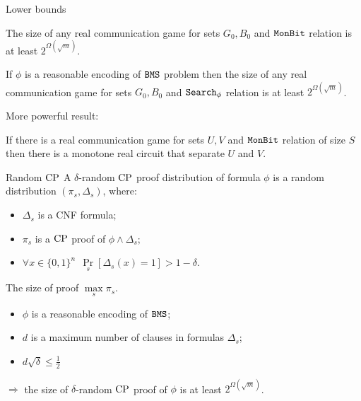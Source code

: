 \begin{frame}{Lower bounds}


    \begin{theorem}[S 2016, unp.]
        The size of any real communication game for sets $G_0, B_0$ and $\mathtt{MonBit}$ relation is at least $2^{\Omega(\sqrt{m})}$.

        If $\phi$ is a reasonable encoding of $\mathtt{BMS}$ problem then the size of any real communication game for sets $G_0, B_0$
        and $\mathtt{Search}_{\phi}$ relation is at least $2^{\Omega(\sqrt{m})}$.
    \end{theorem}

    More powerful result:
    \begin{theorem}
        If there is a real communication game for sets $U, V$ and $\mathtt{MonBit}$ relation of size $S$ then there is a monotone real
        circuit that separate $U$ and $V$.
    \end{theorem}
\end{frame}


\begin{frame}{Random $\mathrm{CP}$}
    A $\delta$-random $\mathrm{CP}$ proof distribution of formula $\phi$ is a random distribution $(\pi_s,
    \Delta_s)$, where:
    \begin{itemize}
        \item $\Delta_s$ is a CNF formula;
        \item $\pi_s$ is a $\mathrm{CP}$ proof of $\phi \land \Delta_s$;
        \item $\forall x \in \{0, 1\}^n ~~ \Pr\limits_s[\Delta_s(x) = 1] > 1 - \delta$.
    \end{itemize}

    The size of proof $\max\limits_s \pi_s$.
    \pause

    \begin{theorem}[S 2016, unp.]
        \begin{itemize}
            \item $\phi$ is a reasonable encoding of $\mathtt{BMS}$;
            \item $d$ is a maximum number of clauses in formulas $\Delta_s$;
            \item $d \sqrt{\delta} \le \frac{1}{2}$
        \end{itemize}
        $\Rightarrow$ the size of $\delta$-random $\mathrm{CP}$ proof of $\phi$ is at least $2^{\Omega(\sqrt{m})}$.
    \end{theorem}
\end{frame}


